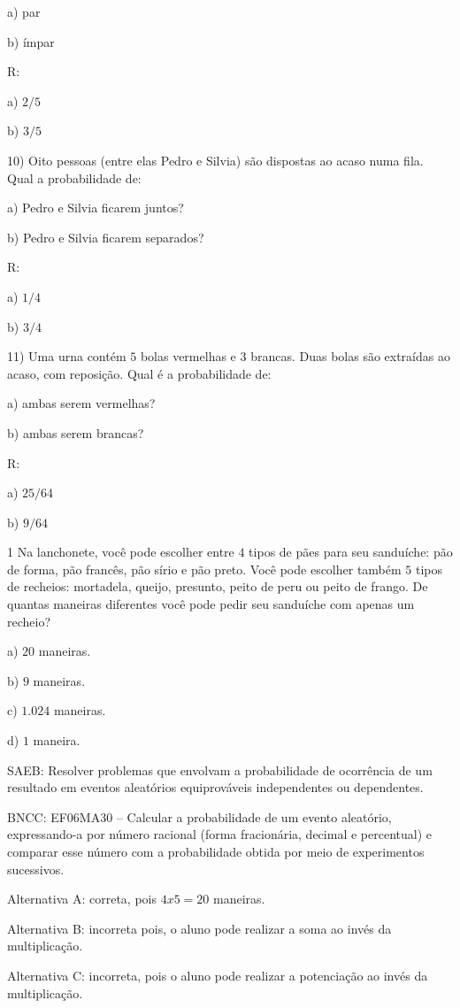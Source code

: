 a) par

b) ímpar

R:

a) $2/5$

b) $3/5$

10) Oito pessoas (entre elas Pedro e Silvia) são dispostas ao acaso numa
fila. Qual a probabilidade de:

a) Pedro e Silvia ficarem juntos?

b) Pedro e Silvia ficarem separados?

R:

a) $1/4$

b) $3/4$

11) Uma urna contém $5$ bolas vermelhas e $3$ brancas. Duas bolas são
extraídas ao acaso, com reposição. Qual é a probabilidade de:

a) ambas serem vermelhas?

b) ambas serem brancas?

R:

a) $25/64$

b) $9/64$


\num{1}  Na lanchonete, você pode escolher entre $4$ tipos de pães para seu
sanduíche: pão de forma, pão francês, pão sírio e pão preto. Você pode
escolher também $5$ tipos de recheios: mortadela, queijo, presunto, peito
de peru ou peito de frango. De quantas maneiras diferentes você pode
pedir seu sanduíche com apenas um recheio?

a) $20$ maneiras.

b) $9$ maneiras.

c) $1.024$ maneiras.

d) $1$ maneira.

SAEB: Resolver problemas que envolvam a probabilidade de ocorrência de
um resultado em eventos aleatórios equiprováveis independentes ou
dependentes.

BNCC: EF06MA30 -- Calcular a probabilidade de um evento aleatório,
expressando-a por número racional (forma fracionária, decimal e
percentual) e comparar esse número com a probabilidade obtida por meio
de experimentos sucessivos.

Alternativa A: correta, pois $4 x 5 = 20$ maneiras.

Alternativa B: incorreta pois, o aluno pode realizar a soma ao invés da
multiplicação.

Alternativa C: incorreta, pois o aluno pode realizar a potenciação ao
invés da multiplicação.

